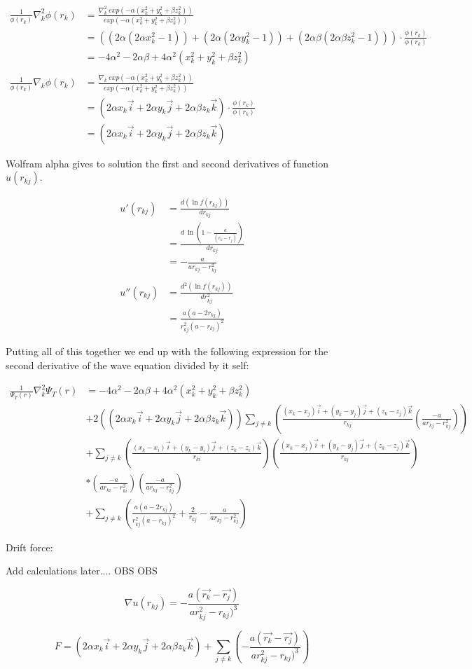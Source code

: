 \documentclass[a4paper,10pt,twoside]{report}
\begin{document}
\begin{align*}
\frac{1}{\phi(r_k)}\nabla_k^2 \phi(r_k) &= \frac{\nabla_k^2 \ exp(-\alpha(x_k^2 + y_k^2 + \beta z_k^2))}{exp(-\alpha(x_k^2 + y_k^2 + \beta z_k^2))}\\
&= ((2\alpha(2\alpha x_k^2 - 1)) + (2\alpha(2\alpha y_k^2 - 1)) + (2\alpha \beta(2\alpha \beta z_k^2 - 1))) \cdot \frac{\phi(r_k)}{\phi(r_k)}\\
&=-4\alpha^2 - 2\alpha \beta + 4\alpha^2(x_k^2 + y_k^2 + \beta z_k^2)\\ \\
\frac{1}{\phi(r_k)}\nabla_k \phi(r_k) &= \frac{\nabla_k \ exp(-\alpha(x_k^2 + y_k^2 + \beta z_k^2))}{exp(-\alpha(x_k^2 + y_k^2 + \beta z_k^2))}\\
&= (2\alpha x_k \vec{i} + 2\alpha y_k \vec{j} + 2\alpha \beta z_k \vec{k}) \cdot \frac{\phi(r_k)}{\phi(r_k)}\\
&= (2\alpha x_k \vec{i} + 2\alpha y_k \vec{j} + 2\alpha \beta z_k \vec{k})
\end{align*}

Wolfram alpha gives to solution the first and second derivatives of function $u(r_{kj})$.

\begin{align*}
u'(r_{kj}) &= \frac{d (\ln{f(r_{kj})})}{dr_{kj}} \\
&= \frac{d\ \ln{\left(1 - \frac{a}{(r_k - r_j)}\right)}}{dr_{kj}} \\
&= - \frac{a}{ar_{kj} - r_{kj}^2}\\ \\
u''(r_{kj}) &= \frac{d^2 (\ln{f(r_{kj})})}{dr_{kj}^2} \\
&= \frac{a(a - 2r_{kj})}{r_{kj}^2(a - r_{kj})^2}
\end{align*}

Putting all of this together we end up with the following expression for the second derivative of the wave equation divided by it self:

\begin{align*}
\frac{1}{\Psi_T(r)}\nabla_k^2 \Psi_T(r) &= -4\alpha^2 - 2\alpha \beta + 4\alpha^2(x_k^2 + y_k^2 + \beta z_k^2) \\
&+ 2((2\alpha x_k \vec{i} + 2\alpha y_k \vec{j} + 2\alpha \beta z_k \vec{k})) \sum_{j \ne k} \left( \frac{(x_k - x_j)\vec{i} + (y_k - y_j)\vec{j} + (z_k - z_j)\vec{k}}{r_{kj}} \left( \frac{-a}{ar_{kj} - r_{kj}^2} \right) \right)\\
&+ \sum_{j \ne k} \left( \frac{(x_k - x_i)\vec{i} + (y_k - y_i)\vec{j} + (z_k - z_i)\vec{k}}{r_{ki}} \right) \left( \frac{(x_k - x_j)\vec{i} + (y_k - y_j)\vec{j} + (z_k - z_j)\vec{k}}{r_{kj}} \right) \\
&* \left( \frac{-a}{ar_{ki} - r_{ki}^2} \right) \left( \frac{-a}{ar_{kj} - r_{kj}^2} \right)\\
&+ \sum_{j \ne k} \left( \frac{a(a - 2r_{kj})}{r_{kj}^2(a - r_{kj})^2} + \frac{2}{r_{kj}} - \frac{a}{ar_{kj} - r_{kj}^2}\right)
\end{align*}

Drift force:

Add calculations later.... OBS OBS

$$\nabla u(r_{kj}) = - \frac{a(\vec{r_k} - \vec{r_j})}{ar_{kj}^2 - r_{kj})^3}$$

$$F = (2\alpha x_k \vec{i} + 2\alpha y_k \vec{j} + 2\alpha \beta z_k \vec{k}) + \sum_{j \ne k} \left( - \frac{a(\vec{r_k} - \vec{r_j})}{ar_{kj}^2 - r_{kj})^3} \right)$$
\end{document}
